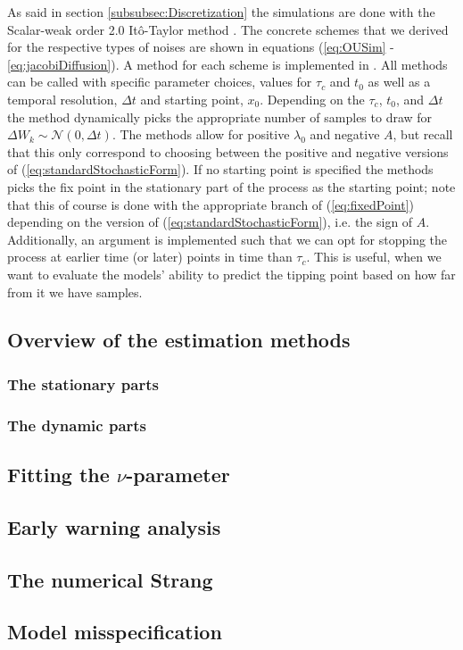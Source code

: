 As said in section \ref{subsubsec:Discretization} the simulations are done with the Scalar-weak order 2.0 Itô-Taylor method \cite[algorithm 8.5]{Srkk2019}. The concrete schemes that we derived for the respective types of noises are shown in equations (\ref{eq:OUSim} - \ref{eq:jacobiDiffusion}). A method for each scheme is implemented in . All methods can be called with specific parameter choices, values for $\tau_c$ and $t_0$ as well as a temporal resolution, $\Delta t$ and starting point, $x_0$. Depending on the $\tau_c$, $t_0$, and $\Delta t$ the method dynamically picks the appropriate number of samples to draw for $\Delta W_k\sim\mathcal{N}\left(0,\Delta t\right)$. The methods allow for positive $\lambda_0$ and negative $A$, but recall that this only correspond to choosing between the positive and negative versions of (\ref{eq:standardStochasticForm}). If no starting point is specified the methods picks the fix point in the stationary part of the process as the starting point; note that this of course is done with the appropriate branch of (\ref{eq:fixedPoint}) depending on the version of (\ref{eq:standardStochasticForm}), i.e. the sign of $A$. Additionally, an argument is implemented such that we can opt for stopping the process at earlier time (or later) points in time than $\tau_c$. This is useful, when we want to evaluate the models' ability to predict the tipping point based on how far from it we have samples.
\subsection{Overview of the estimation methods}
\subsubsection{The stationary parts}

\subsubsection{The dynamic parts}

\subsection{Fitting the $\nu$-parameter}

\subsection{Early warning analysis}

\subsection{The numerical Strang}

\subsection{Model misspecification}